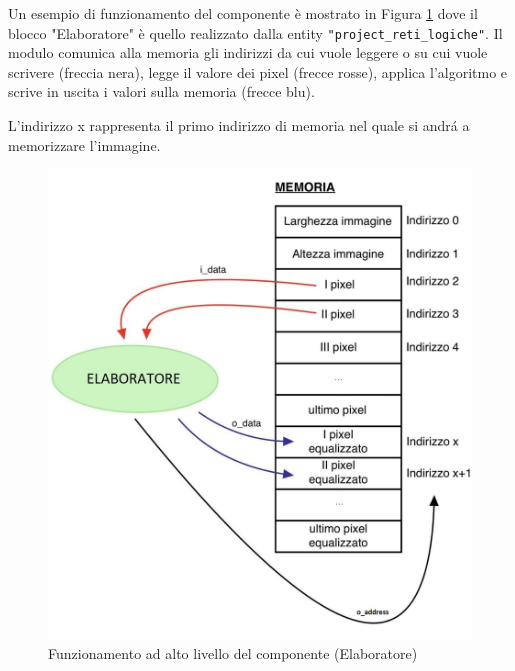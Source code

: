 Un esempio di funzionamento del componente è mostrato in Figura \ref{elaboratore} dove il blocco "Elaboratore" è quello realizzato dalla entity \texttt{"project\_reti\_logiche"}.
Il modulo comunica alla memoria gli indirizzi da cui vuole leggere o su cui vuole scrivere (freccia nera), legge il valore dei pixel (frecce rosse), applica l'algoritmo e scrive in uscita i valori sulla memoria (frecce blu).

L’indirizzo x rappresenta il primo indirizzo di memoria nel quale si andrá a memorizzare l’immagine.


\begin{figure}[ht]
    \centering           %
    \includegraphics[scale = 0.205]{Figure/elaboratore} %
    \caption{Funzionamento ad alto livello del componente (Elaboratore)}
    \label{elaboratore}
\end{figure}

\clearpage